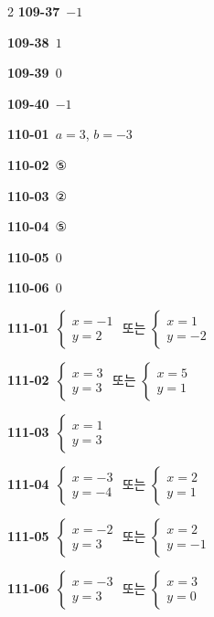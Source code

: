 \documentclass[10pt,a4paper]{article}
\begin{document}
\begin{multicols}{2}
\noindent\textbf{109-37}\ $-1$\par
\noindent\textbf{109-38}\ $1$\par
\noindent\textbf{109-39}\ $0$\par
\noindent\textbf{109-40}\ $-1$\par
\noindent\textbf{110-01}\ $a=3$, $b=-3$\par
\noindent\textbf{110-02}\ ⑤\par
\noindent\textbf{110-03}\ ②\par
\noindent\textbf{110-04}\ ⑤\par
\noindent\textbf{110-05}\ $0$\par
\noindent\textbf{110-06}\ $0$\par
\noindent\textbf{111-01}\ $\begin{cases} x=-1 \\ y=2 \end{cases}$ 또는 $\begin{cases} x=1 \\ y=-2 \end{cases}$\par
\noindent\textbf{111-02}\ $\begin{cases} x=3 \\ y=3 \end{cases}$ 또는 $\begin{cases} x=5 \\ y=1 \end{cases}$\par
\noindent\textbf{111-03}\ $\begin{cases} x=1 \\ y=3 \end{cases}$\par
\noindent\textbf{111-04}\ $\begin{cases} x=-3 \\ y=-4 \end{cases}$ 또는 $\begin{cases} x=2 \\ y=1 \end{cases}$\par
\noindent\textbf{111-05}\ $\begin{cases} x=-2 \\ y=3 \end{cases}$ 또는 $\begin{cases} x=2 \\ y=-1 \end{cases}$\par
\noindent\textbf{111-06}\ $\begin{cases} x=-3 \\ y=3 \end{cases}$ 또는 $\begin{cases} x=3 \\ y=0 \end{cases}$\par

\end{multicols}
\end{document}
